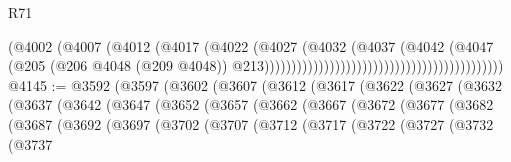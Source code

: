 \begin{lexlean}{R71}
\begin{coremodule}
                                                                      (@4002
                                                                        (@4007
                                                                          (@4012
                                                                            (@4017
                                                                              (@4022
                                                                                (@4027
                                                                                  (@4032
                                                                                    (@4037
                                                                                      (@4042
                                                                                        (@4047
                                                                                          (@205
                                                                                            (@206
                                                                                              @4048
                                                                                              (@209
                                                                                                @4048))
                                                                                            @213))))))))))))))))))))))))))))))))))))))))))))
@4145 := @3592
    (@3597
      (@3602
        (@3607
          (@3612
            (@3617
              (@3622
                (@3627
                  (@3632
                    (@3637
                      (@3642
                        (@3647
                          (@3652
                            (@3657
                              (@3662
                                (@3667
                                  (@3672
                                    (@3677
                                      (@3682
                                        (@3687
                                          (@3692
                                            (@3697
                                              (@3702
                                                (@3707
                                                  (@3712
                                                    (@3717
                                                      (@3722
                                                        (@3727
                                                          (@3732
                                                            (@3737

\end{coremodule}
\end{lexlean}
